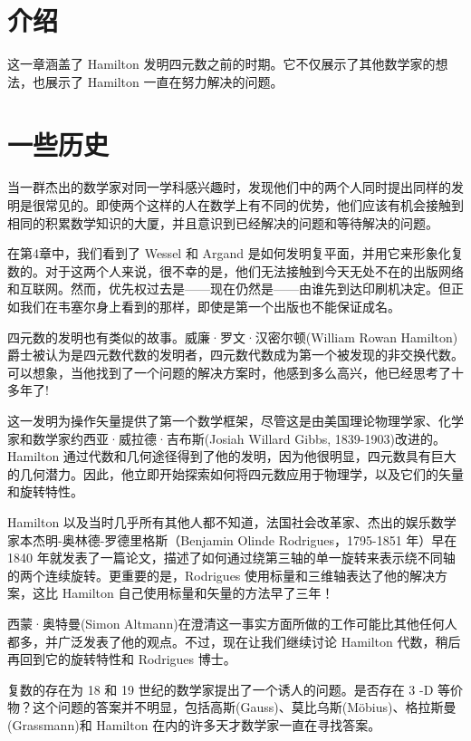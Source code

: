 
\section{介绍}
这一章涵盖了 Hamilton 发明四元数之前的时期。它不仅展示了其他数学家的想法，也展示了 Hamilton 一直在努力解决的问题。

\section{一些历史}
当一群杰出的数学家对同一学科感兴趣时，发现他们中的两个人同时提出同样的发明是很常见的。即使两个这样的人在数学上有不同的优势，他们应该有机会接触到相同的积累数学知识的大厦，并且意识到已经解决的问题和等待解决的问题。

在第4章中，我们看到了 Wessel 和 Argand 是如何发明复平面，并用它来形象化复数的。对于这两个人来说，很不幸的是，他们无法接触到今天无处不在的出版网络和互联网。然而，优先权过去是——现在仍然是——由谁先到达印刷机决定。但正如我们在韦塞尔身上看到的那样，即使是第一个出版也不能保证成名。

四元数的发明也有类似的故事。威廉·罗文·汉密尔顿(William Rowan Hamilton)爵士被认为是四元数代数的发明者，四元数代数成为第一个被发现的非交换代数。可以想象，当他找到了一个问题的解决方案时，他感到多么高兴，他已经思考了十多年了!

这一发明为操作矢量提供了第一个数学框架，尽管这是由美国理论物理学家、化学家和数学家约西亚·威拉德·吉布斯(Josiah Willard Gibbs, 1839-1903)改进的。Hamilton 通过代数和几何途径得到了他的发明，因为他很明显，四元数具有巨大的几何潜力。因此，他立即开始探索如何将四元数应用于物理学，以及它们的矢量和旋转特性。

Hamilton 以及当时几乎所有其他人都不知道，法国社会改革家、杰出的娱乐数学家本杰明-奥林德-罗德里格斯（Benjamin Olinde Rodrigues，1795-1851 年）早在 1840 年就发表了一篇论文，描述了如何通过绕第三轴的单一旋转来表示绕不同轴的两个连续旋转\cite{bib5-1}。更重要的是，Rodrigues 使用标量和三维轴表达了他的解决方案，这比 Hamilton 自己使用标量和矢量的方法早了三年！


西蒙·奥特曼(Simon Altmann)在澄清这一事实方面所做的工作可能比其他任何人都多，并广泛发表了他的观点\cite{bib5-2, bib5-3, bib5-4, bib5-5}。不过，现在让我们继续讨论 Hamilton 代数，稍后再回到它的旋转特性和 Rodrigues 博士。

复数的存在为 18 和 19 世纪的数学家提出了一个诱人的问题。是否存在 3 -D 等价物？这个问题的答案并不明显，包括高斯(Gauss)、莫比乌斯(Möbius)、格拉斯曼(Grassmann)和 Hamilton 在内的许多天才数学家一直在寻找答案。

